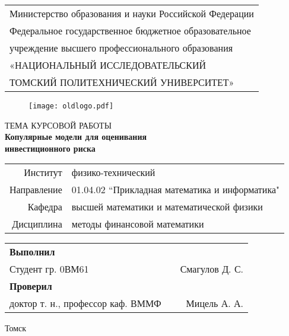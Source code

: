 \begin{titlepage}

\begin{table}[t]
    \centering
    \begin{tabularx}{\textwidth}{>{\setlength{\hsize}{\hsize}}Y}
        Министерство образования и науки Российской Федерации \\
        Федеральное государственное бюджетное образовательное \\ 
        учреждение высшего профессионального образования \\
        «НАЦИОНАЛЬНЫЙ ИССЛЕДОВАТЕЛЬСКИЙ \\
        ТОМСКИЙ ПОЛИТЕХНИЧЕСКИЙ УНИВЕРСИТЕТ» \\
        \hline
    \end{tabularx}
\end{table}

\begin{figure}[h]
\centering
\texttt{[image: oldlogo.pdf]}
\end{figure}

\begin{center}
ТЕМА КУРСОВОЙ РАБОТЫ\\
\large{\textbf{Копулярные модели для оценивания\\инвестиционного риска}}
\end{center}

\vspace{\fill}

\begin{center}
\begin{tabular}{rl}
    Институт & физико-технический \\
    Направление & 01.04.02 ``Прикладная математика и информатика" \\
    Кафедра & высшей математики и математической физики \\
    Дисциплина & методы финансовой математики \\
\end{tabular}
\end{center}


\begin{table}[h]
    \centering
    \begin{tabular}{lcr}
        \textbf{Выполнил} & & \\
        Студент гр. 0ВМ61 & \underline{\hspace{2.5cm}} & Смагулов Д. С. \\
        \textbf{Проверил} & & \\
        доктор т. н., профессор каф. ВММФ & \underline{\hspace{2.5cm}} & Мицель А. А. \\
    \end{tabular}
\end{table}

\vspace{0.5cm}

\begin{center}
Томск\\ \the\year
\end{center}

\end{titlepage}
